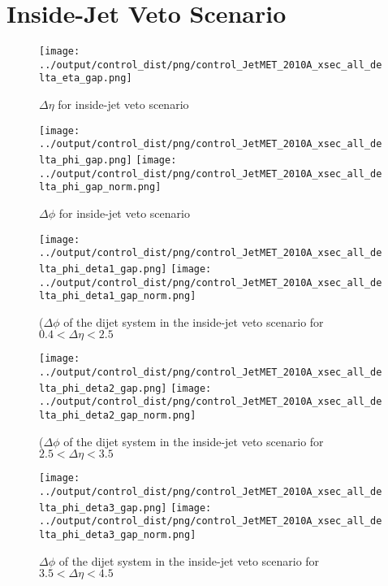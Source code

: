 \documentclass[11pt]{article}
\begin{document}
\clearpage


\section{Inside-Jet Veto Scenario}

\begin{figure}[ht]
\centering
\texttt{[image: ../output/control\_dist/png/control\_JetMET\_2010A\_xsec\_all\_delta\_eta\_gap.png]}
\caption{$\Delta\eta$ for inside-jet veto scenario}
\label{fig:delta_eta_gap}
\end{figure}

\begin{figure}[ht]
\centering
\texttt{[image: ../output/control\_dist/png/control\_JetMET\_2010A\_xsec\_all\_delta\_phi\_gap.png]}
\texttt{[image: ../output/control\_dist/png/control\_JetMET\_2010A\_xsec\_all\_delta\_phi\_gap\_norm.png]}
\caption{$\Delta\phi$ for inside-jet veto scenario}
\label{fig:delta_phi_gap}
\end{figure}


\begin{figure}[ht]
\centering
\texttt{[image: ../output/control\_dist/png/control\_JetMET\_2010A\_xsec\_all\_delta\_phi\_deta1\_gap.png]}
\texttt{[image: ../output/control\_dist/png/control\_JetMET\_2010A\_xsec\_all\_delta\_phi\_deta1\_gap\_norm.png]}
\caption{($\Delta\phi$ of the dijet system in the inside-jet veto scenario for $0.4 < \Delta\eta < 2.5$}
\label{fig:delta_gap_deta1}
\end{figure}

\begin{figure}[ht]
\centering
\texttt{[image: ../output/control\_dist/png/control\_JetMET\_2010A\_xsec\_all\_delta\_phi\_deta2\_gap.png]}
\texttt{[image: ../output/control\_dist/png/control\_JetMET\_2010A\_xsec\_all\_delta\_phi\_deta2\_gap\_norm.png]}
\caption{($\Delta\phi$ of the dijet system in the inside-jet veto scenario for $2.5 < \Delta\eta < 3.5$}
\label{fig:delta_gap_deta2}
\end{figure}


\begin{figure}[ht]
\centering
\texttt{[image: ../output/control\_dist/png/control\_JetMET\_2010A\_xsec\_all\_delta\_phi\_deta3\_gap.png]}
\texttt{[image: ../output/control\_dist/png/control\_JetMET\_2010A\_xsec\_all\_delta\_phi\_deta3\_gap\_norm.png]}
\caption{$\Delta\phi$ of the dijet system in the inside-jet veto scenario for $3.5 < \Delta\eta < 4.5$}
\label{fig:delta_gap_deta3}
\end{figure}
\end{document}
